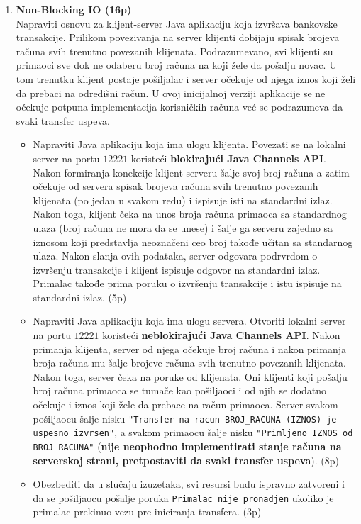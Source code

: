 \documentclass[]{article}
\begin{document}
\begin{enumerate}
  
\item \textbf{Non-Blocking IO (16p)}
\\Napraviti osnovu za klijent-server Java aplikaciju koja izvr\v{s}ava bankovske transakcije. Prilikom povezivanja na server klijenti dobijaju spisak brojeva ra\v{c}una svih trenutno povezanih klijenata. Podrazumevano, svi klijenti su primaoci sve dok ne odaberu broj ra\v{c}una na koji \v{z}ele da po\v{s}alju novac. U tom trenutku klijent postaje po\v{s}iljalac i server o\v{c}ekuje od njega iznos koji \v{z}eli da prebaci na odredi\v{s}ni ra\v{c}un. U ovoj inicijalnoj verziji aplikacije se ne o\v{c}ekuje potpuna implementacija korisni\v{c}kih ra\v{c}una ve\'c{} se podrazumeva da svaki transfer uspeva.

\begin{itemize}
  \item Napraviti Java aplikaciju koja ima ulogu klijenta. Povezati se na lokalni server na portu $12221$ koristeći \textbf{blokiraju\'c{}i Java Channels API}. Nakon formiranja konekcije klijent serveru \v{s}alje svoj broj ra\v{c}una a zatim o\v{c}ekuje od servera spisak brojeva ra\v{c}una svih trenutno povezanih klijenata (po jedan u svakom redu) i ispisuje isti na standardni izlaz. Nakon toga, klijent \v{c}eka na unos broja ra\v{c}una primaoca sa standardnog ulaza (broj ra\v{c}una ne mora da se unese) i \v{s}alje ga serveru zajedno sa iznosom koji predstavlja neozna\v{c}eni ceo broj takođe u\v{c}itan sa standarnog ulaza. Nakon slanja ovih podataka, server odgovara podrvrdom o izvr\v{s}enju transakcije i klijent ispisuje odgovor na standardni izlaz. Primalac takođe prima poruku o izvr\v{s}enju transakcije i istu ispisuje na standardni izlaz. \hfill (5p)
  \item Napraviti Java aplikaciju koja ima ulogu servera. Otvoriti lokalni server na portu $12221$ koristeći \textbf{neblokiraju\'c{}i Java Channels API}. Nakon primanja klijenta, server od njega o\v{c}ekuje broj ra\v{c}una i nakon primanja broja ra\v{c}una mu \v{s}alje brojeve ra\v{c}una svih trenutno povezanih klijenata. Nakon toga, server \v{c}eka na poruke od klijenata. Oni klijenti koji po\v{s}alju broj ra\v{c}una primaoca se tuma\v{c}e kao po\v{s}iljaoci i od njih se dodatno o\v{c}ekuje i iznos koji \v{z}ele da prebace na ra\v{c}un primaoca. Server svakom po\v{s}iljaocu \v{s}alje nisku \texttt{"Transfer na racun BROJ\_RACUNA (IZNOS) je uspesno izvrsen"}, a svakom primaocu \v{s}alje nisku \texttt{"Primljeno IZNOS od BROJ\_RACUNA"} (\textbf{nije neophodno implementirati stanje ra\v{c}una na serverskoj strani, pretpostaviti da svaki transfer uspeva}). \hfill (8p)
  \item Obezbediti da u slučaju izuzetaka, svi resursi budu ispravno zatvoreni i da se po\v{s}iljaocu po\v{s}alje poruka \texttt{Primalac nije pronadjen} ukoliko je primalac prekinuo vezu pre iniciranja transfera. \hfill (3p)
\end{itemize}


\end{enumerate}
\end{document}
